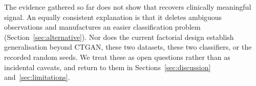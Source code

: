 The evidence gathered so far does not show that \sepa{} recovers clinically meaningful signal. An equally consistent explanation is that it deletes ambiguous observations and manufactures an easier classification problem (Section~\ref{sec:alternative}). Nor does the current factorial design establish generalisation beyond CTGAN, these two datasets, these two classifiers, or the recorded random seeds. We treat these as open questions rather than as incidental caveats, and return to them in Sections~\ref{sec:discussion} and~\ref{sec:limitations}.
